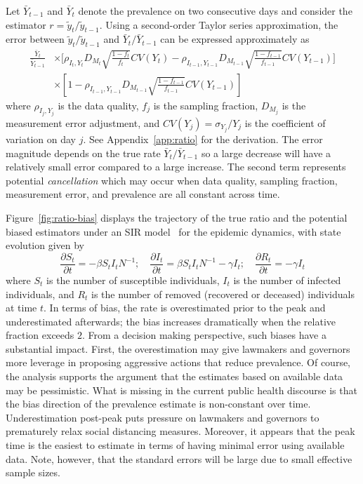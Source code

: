 \documentclass[11pt]{amsart}
\begin{document}
Let $\bar Y_{t-1}$ and $\bar Y_{t}$ denote the prevalence on two consecutive days and consider the estimator $r = \tilde y_t / \tilde y_{t-1}$.  Using a second-order Taylor series approximation, the error between ${\tilde y_t}/{\tilde y_{t-1}}$ and ${\bar Y_{t}}/{\bar Y_{t-1}}$ can be expressed approximately as
$$
\begin{aligned}
\frac{\bar Y_t}{\bar Y_{t-1}} &\times \bigg[ \rho_{I_t,Y_t} D_{M_t} \sqrt{\frac{1-f_t}{f_t}} CV (Y_t)  -\rho_{I_{t-1},Y_{t-1}} D_{M_{t-1}} \sqrt{\frac{1-f_{t-1}}{f_{t-1}}} CV (Y_{t-1}) \bigg] \\
&\times \left[ 1 - \rho_{I_{t-1},Y_{t-1}} D_{M_{t-1}} \sqrt{\frac{1-f_{t-1}}{f_{t-1}}} CV (Y_{t-1}) \right]
\end{aligned}
$$
where $\rho_{I_j, Y_j}$ is the data quality, $f_j$ is the sampling fraction, $D_{M_j}$ is the measurement error adjustment, and $CV(Y_j) = \sigma_{Y_j}/Y_j$ is the coefficient of variation on day $j$.  See Appendix~\ref{app:ratio} for the derivation. The error magnitude depends on the true rate $\bar Y_{t} / \bar Y_{t-1}$ so a large decrease will have a relatively small error compared to a large increase. The second term represents potential \emph{cancellation} which may occur when data quality, sampling fraction, measurement error, and prevalence are all constant across time.

Figure~\ref{fig:ratio-bias} displays the trajectory of the true ratio and the potential biased estimators under an SIR model~\citep{Pastor2001,Newman2002,Parshani2010} for the epidemic dynamics, with state evolution given by
\begin{equation}
\label{eq:sir}
\frac{\partial S_t}{\partial t} = - \beta S_t I_t N^{-1}; \quad
\frac{\partial I_t}{\partial t} = \beta S_t I_t N^{-1} - \gamma I_t; \quad
\frac{\partial R_t}{\partial t} = - \gamma I_t
\end{equation}
where $S_t$ is the number of susceptible individuals, $I_t$ is the number of infected individuals, and $R_t$ is the number of removed (recovered or deceased) individuals at time $t$.  In terms of bias, the rate is overestimated prior to the peak and underestimated afterwards; the bias increases dramatically when the relative fraction exceeds $2$.  From a decision making perspective, such biases have a substantial impact.  First, the overestimation may give lawmakers and governors more leverage in proposing aggressive actions that reduce prevalence.  Of course, the analysis supports the argument that the estimates based on available data may be pessimistic. What is missing in the current public health discourse is that the bias direction of the prevalence estimate is non-constant over time.   Underestimation post-peak puts pressure on lawmakers and governors to prematurely relax social distancing measures.  Moreover, it appears that the peak time is the easiest to estimate in terms of having minimal error using available data.  Note, however, that the standard errors will be large due to small effective sample sizes.
\end{document}
